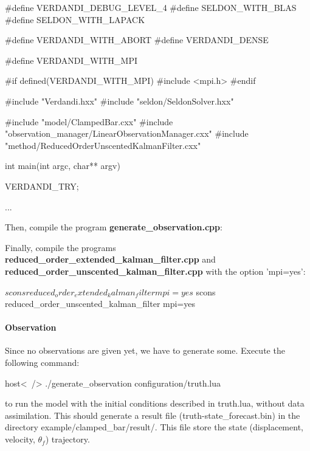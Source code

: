 \begin{frame_cpp}
#define VERDANDI_DEBUG_LEVEL_4
#define SELDON_WITH_BLAS
#define SELDON_WITH_LAPACK

#define VERDANDI_WITH_ABORT
#define VERDANDI_DENSE

#define VERDANDI_WITH_MPI

#if defined(VERDANDI_WITH_MPI)
#include <mpi.h>
#endif


#include "Verdandi.hxx"
#include "seldon/SeldonSolver.hxx"

#include "model/ClampedBar.cxx"
#include "observation_manager/LinearObservationManager.cxx"
#include "method/ReducedOrderUnscentedKalmanFilter.cxx"


int main(int argc, char** argv)
{

    VERDANDI_TRY;

    ...
}
\end{frame_cpp}

Then, compile the program \textbf{generate\_observation.cpp}:



Finally, compile the programs \textbf{reduced\_order\_extended\_kalman\_filter.cpp} and \textbf{reduced\_order\_unscented\_kalman\_filter.cpp}  with the option 'mpi=yes':
\begin{frame_bash}
$ scons reduced_order_extended_kalman_filter mpi=yes
$ scons reduced_order_unscented_kalman_filter mpi=yes
\end{frame_bash}



\hypertarget{par-seq-example-observation}{}\paragraph{Observation}\label{par-seq-example-observation}

\-Since no observations are given yet, we have to generate some. \-Execute the following command\-:
\begin{frame_bash}
host<~/> ./generate_observation configuration/truth.lua
\end{frame_bash}
  to run the model with the initial conditions described in {\ttfamily truth.\-lua}, without data assimilation. \-This should generate a result file ({\ttfamily truth-\/state\-\_\-forecast.\-bin}) in the directory {\ttfamily example/clamped\-\_\-bar/result/}. \-This file store the state (displacement, velocity, $ \theta_{f} $) trajectory.

